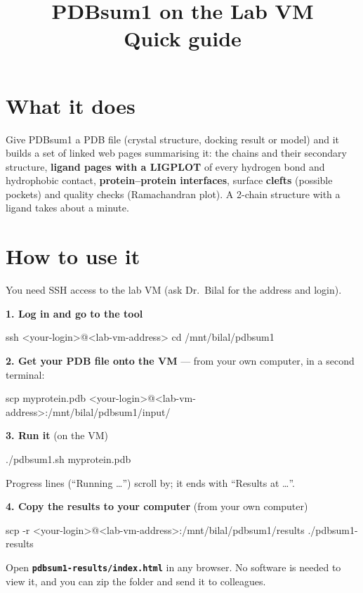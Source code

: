 \documentclass[11pt,a4paper]{article}
\title{\textbf{PDBsum1 on the Lab VM}\\[0.2em]\large Quick guide}
\author{}
\date{}
\newcommand{\file}[1]{\texttt{#1}}
\begin{document}
\maketitle
\vspace{-2em}

\section*{What it does}
Give PDBsum1 a PDB file (crystal structure, docking result or model) and it builds a set of linked web pages summarising it: the chains and their secondary structure, \textbf{ligand pages with a LIGPLOT} of every hydrogen bond and hydrophobic contact, \textbf{protein--protein interfaces}, surface \textbf{clefts} (possible pockets) and quality checks (Ramachandran plot). A 2-chain structure with a ligand takes about a minute.

\section*{How to use it}
You need SSH access to the lab VM (ask Dr.~Bilal for the address and login).

\textbf{1. Log in and go to the tool}
\begin{cmd}
ssh <your-login>@<lab-vm-address>
cd /mnt/bilal/pdbsum1
\end{cmd}

\textbf{2. Get your PDB file onto the VM} --- from your own computer, in a second terminal:
\begin{cmd}
scp myprotein.pdb <your-login>@<lab-vm-address>:/mnt/bilal/pdbsum1/input/
\end{cmd}

\textbf{3. Run it} (on the VM)
\begin{cmd}
./pdbsum1.sh myprotein.pdb
\end{cmd}
Progress lines (``Running \ldots'') scroll by; it ends with ``Results at \ldots''.

\textbf{4. Copy the results to your computer} (from your own computer)
\begin{cmd}
scp -r <your-login>@<lab-vm-address>:/mnt/bilal/pdbsum1/results  ./pdbsum1-results
\end{cmd}
Open \textbf{\file{pdbsum1-results/index.html}} in any browser. No software is needed to view it, and you can zip the folder and send it to colleagues.
\end{document}

